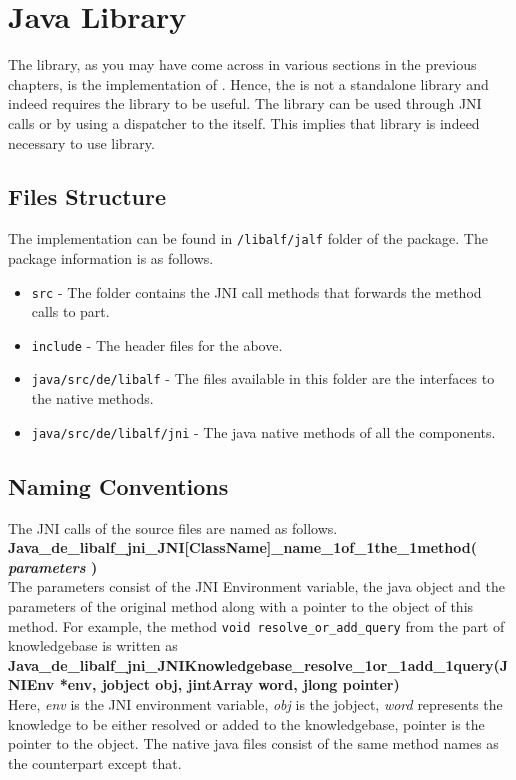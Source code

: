 \chapter{\jalf Java Library}

The \jalf \java library, as you may have come across in various sections in the previous chapters, is the \java implementation of \libalf. Hence, the \jalf is not a standalone library and indeed requires the \libalf library to be useful. The \jalf library can be used through JNI calls or by using a dispatcher to the \cpp \libalf itself. This implies that \libalf library is indeed necessary to use \jalf \java library. 

\section{Files Structure}
The \jalf implementation can be found in \texttt{/libalf/jalf} folder of the \libalf package. The \jalf package information is as follows.
\begin{itemize}
 \item \texttt{src} - The folder contains the JNI call methods that forwards the method calls to \cpp part.
 \item \texttt{include} - The header files for the above.
 \item \texttt{java/src/de/libalf} - The files available in this folder are the interfaces to the native methods.
 \item \texttt{java/src/de/libalf/jni} - The java native methods of all the components.
\end{itemize}

\section{Naming Conventions}
The JNI calls of the source files are named as follows. \\
\textbf{Java\_de\_libalf\_jni\_JNI[ClassName]\_name\_1of\_1the\_1method( \emph{parameters} )} \\
The parameters consist of the JNI Environment variable, the java object and the parameters of the original method along with a pointer to the object of this method. For example, the method \texttt{void resolve\_or\_add\_query} from the \cpp part of knowledgebase is written as \\
\textbf{Java\_de\_libalf\_jni\_JNIKnowledgebase\_resolve\_1or\_1add\_1query(JNIEnv *env, jobject obj, jintArray word, jlong pointer)} \\
Here, \emph{env} is the JNI environment variable,  \emph{obj} is the jobject, \emph{word} represents the knowledge to be either resolved or added to the knowledgebase, pointer is the pointer to the \cpp object. The native java files consist of the same method names as the \cpp counterpart except that.

